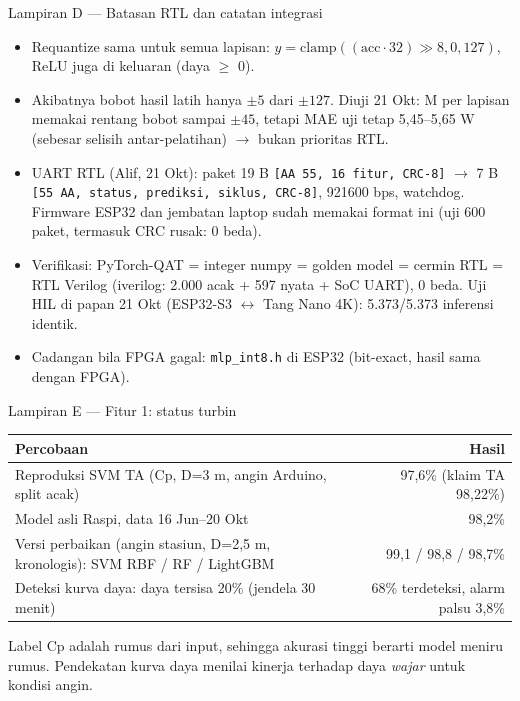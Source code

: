 \documentclass[aspectratio=169, 10pt]{beamer}
\begin{document}
\begin{frame}{Lampiran D --- Batasan RTL dan catatan integrasi}
\small
\begin{itemize}
  \item Requantize sama untuk semua lapisan: $y = \mathrm{clamp}((\mathrm{acc}\cdot 32) \gg 8, 0, 127)$, ReLU juga di keluaran (daya $\ge$ 0).
  \item Akibatnya bobot hasil latih hanya $\pm5$ dari $\pm127$. Diuji 21 Okt: M per lapisan memakai rentang bobot sampai $\pm45$, tetapi MAE uji tetap 5,45--5,65 W (sebesar selisih antar-pelatihan) $\to$ bukan prioritas RTL.
  \item UART RTL (Alif, 21 Okt): paket 19 B \texttt{[AA 55, 16 fitur, CRC-8]} $\to$ 7 B \texttt{[55 AA, status, prediksi, siklus, CRC-8]}, 921600 bps, watchdog. Firmware ESP32 dan jembatan laptop sudah memakai format ini (uji 600 paket, termasuk CRC rusak: 0 beda).
  \item Verifikasi: PyTorch-QAT = integer numpy = golden model = cermin RTL = RTL Verilog (iverilog: 2.000 acak + 597 nyata + SoC UART), 0 beda. Uji HIL di papan 21 Okt (ESP32-S3 $\leftrightarrow$ Tang Nano 4K): 5.373/5.373 inferensi identik.
  \item Cadangan bila FPGA gagal: \texttt{mlp\_int8.h} di ESP32 (bit-exact, hasil sama dengan FPGA).
\end{itemize}
\end{frame}

\begin{frame}{Lampiran E --- Fitur 1: status turbin}
\small
\begin{tabularx}{\linewidth}{@{}X r@{}}
\toprule
Percobaan & Hasil \\
\midrule
Reproduksi SVM TA (Cp, D=3 m, angin Arduino, split acak) & 97,6\% (klaim TA 98,22\%) \\
Model asli Raspi, data 16 Jun--20 Okt & 98,2\% \\
Versi perbaikan (angin stasiun, D=2,5 m, kronologis): SVM RBF / RF / LightGBM & 99,1 / 98,8 / 98,7\% \\
Deteksi kurva daya: daya tersisa 20\% (jendela 30 menit) & 68\% terdeteksi, alarm palsu 3,8\% \\
\bottomrule
\end{tabularx}
\vspace{4pt}

Label Cp adalah rumus dari input, sehingga akurasi tinggi berarti model meniru rumus. Pendekatan kurva daya menilai kinerja terhadap daya \emph{wajar} untuk kondisi angin.
\end{frame}
\end{document}
